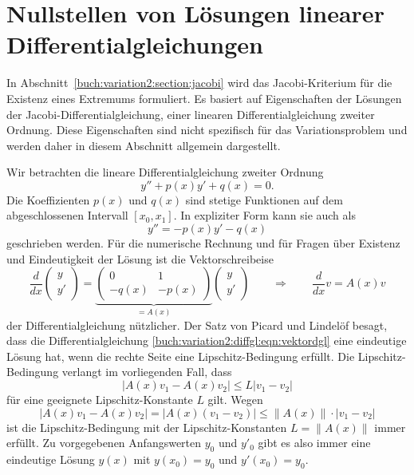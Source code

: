 %
%
%
\section{Nullstellen von Lösungen linearer Differentialgleichungen
\label{buch:variation2:section:diffgl}}
In Abschnitt~\ref{buch:variation2:section:jacobi} wird das
Jacobi-Kriterium für die Existenz eines Extremums formuliert.
Es basiert auf Eigenschaften der Lösungen der Jacobi-Differentialgleichung,
einer linearen Differentialgleichung zweiter Ordnung.
Diese Eigenschaften sind nicht spezifisch für das Variationsproblem
und werden daher in diesem Abschnitt allgemein dargestellt.

Wir betrachten die lineare Differentialgleichung zweiter Ordnung
\begin{equation}
y'' + p(x) y' + q(x) = 0.
\label{buch:variation2:diffgl:eqn:dgl}
\end{equation}
Die Koeffizienten $p(x)$ und $q(x)$ sind stetige Funktionen auf dem
abgeschlossenen Intervall $[x_0,x_1]$.
In expliziter Form kann sie auch als
\begin{equation}
y'' = - p(x) y' - q(x)
\label{buch:variation2:diffgl:eqn:explizit}
\end{equation}
geschrieben werden.
Für die numerische Rechnung und für Fragen über Existenz und Eindeutigkeit
der Lösung ist die Vektorschreibeise
\begin{equation}
\frac{d}{dx}
\begin{pmatrix} y\\ y' \end{pmatrix}
=
\underbrace{
\begin{pmatrix}
    0&    1\\
-q(x)&-p(x)
\end{pmatrix}
}_{\displaystyle =A(x)}
\begin{pmatrix} y\\ y' \end{pmatrix}
\qquad\Rightarrow\qquad
\frac{d}{dx}v = A(x) v
\label{buch:variation2:diffgl:eqn:vektordgl}
\end{equation}
der Differentialgleichung nützlicher.
Der Satz von Picard und Lindelöf besagt, dass die Differentialgleichung
\eqref{buch:variation2:diffgl:eqn:vektordgl} eine eindeutige
Lösung hat, wenn die rechte Seite eine Lipschitz-Bedingung
erfüllt.
Die Lipschitz-Bedingung verlangt im vorliegenden Fall, dass
\[
|A(x)v_1 - A(x)v_2|
\le
L |v_1-v_2|
\]
für eine geeignete Lipschitz-Konstante $L$ gilt.
Wegen
\[
|A(x)v_1-A(x)v_2|
=
|A(x)(v_1-v_2)|
\le
\|A(x)\|\cdot |v_1-v_2|
\]
ist die Lipschitz-Bedingung mit der Lipschitz-Konstanten
$L=\|A(x)\|$ immer erfüllt.
Zu vorgegebenen Anfangswerten $y_0$ und $y'_0$ gibt es also
immer eine eindeutige Lösung $y(x)$ mit $y(x_0)=y_0$ und
$y'(x_0)=y_0$.

